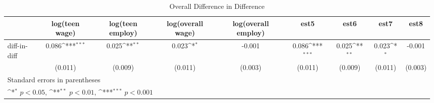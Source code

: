 \begin{table}[htbp]\centering
\def\sym#1{\ifmmode^{#1}\else\(^{#1}\)\fi}
\caption{Overall Difference in Difference\label{auto}}
\begin{tabular}{l*{8}{c}}
\hline\hline
            &log(teen wage)         &log(teen employ)         &log(overall wage)         &log(overall employ)         &        est5         &        est6         &        est7         &        est8         \\
\hline
diff-in-diff&       0.086\sym{***}&       0.025\sym{**} &       0.023\sym{*}  &      -0.001         &       0.086\sym{***}&       0.025\sym{**} &       0.023\sym{*}  &      -0.001         \\
            &     (0.011)         &     (0.009)         &     (0.011)         &     (0.003)         &     (0.011)         &     (0.009)         &     (0.011)         &     (0.003)         \\
\hline\hline
\multicolumn{9}{l}{\footnotesize Standard errors in parentheses}\\
\multicolumn{9}{l}{\footnotesize \sym{*} \(p<0.05\), \sym{**} \(p<0.01\), \sym{***} \(p<0.001\)}\\
\end{tabular}
\end{table}
